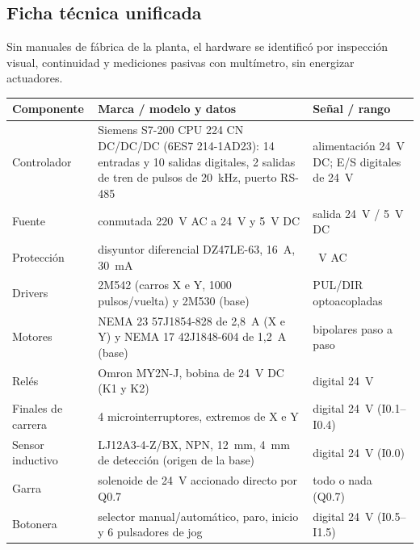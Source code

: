 \documentclass[a4paper,11pt]{article}
\begin{document}
\subsection{Ficha técnica unificada}
Sin manuales de fábrica de la planta, el hardware se identificó por inspección visual, continuidad y mediciones pasivas con multímetro, sin energizar actuadores.
\begin{center}\small
\begin{tabularx}{\linewidth}{>{\raggedright}p{3.4cm} >{\raggedright}X >{\raggedright\arraybackslash}p{3.7cm}}
\toprule
\textbf{Componente} & \textbf{Marca / modelo y datos} & \textbf{Señal / rango}\\
\midrule
Controlador & Siemens S7-200 CPU 224 CN DC/DC/DC (6ES7 214-1AD23): 14 entradas y 10 salidas digitales, 2 salidas de tren de pulsos de 20~kHz, puerto RS-485 & alimentación 24~V DC; E/S digitales de 24~V\\
Fuente & conmutada 220~V AC a 24~V y 5~V DC & salida 24~V / 5~V DC\\
Protección & disyuntor diferencial DZ47LE-63, 16~A, 30~mA & 220~V AC\\
Drivers & 2M542 (carros X e Y, 1000 pulsos/vuelta) y 2M530 (base) & PUL/DIR optoacopladas\\
Motores & NEMA 23 57J1854-828 de 2,8~A (X e Y) y NEMA 17 42J1848-604 de 1,2~A (base) & bipolares paso a paso\\
Relés & Omron MY2N-J, bobina de 24~V DC (K1 y K2) & digital 24~V\\
Finales de carrera & 4 microinterruptores, extremos de X e Y & digital 24~V (I0.1--I0.4)\\
Sensor inductivo & LJ12A3-4-Z/BX, NPN, 12~mm, 4~mm de detección (origen de la base) & digital 24~V (I0.0)\\
Garra & solenoide de 24~V accionado directo por Q0.7 & todo o nada (Q0.7)\\
Botonera & selector manual/automático, paro, inicio y 6 pulsadores de jog & digital 24~V (I0.5--I1.5)\\
\bottomrule
\end{tabularx}
\end{center}
\end{document}
